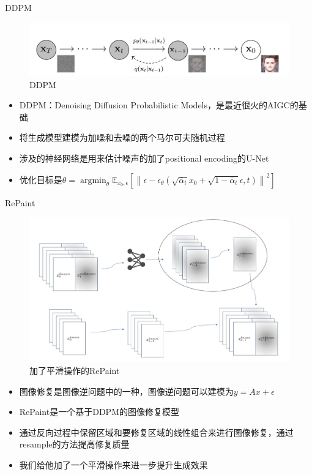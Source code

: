 \documentclass[10pt]{beamer}
\begin{document}
\begin{frame}[fragile]{DDPM}
  \begin{figure}[thbp!]
    \centering
    \includegraphics[width=1\linewidth]{imgs/DDPM.jpg}
    \caption{DDPM}
    \label{fig:DDPM}
    \end{figure}

  \begin{itemize}
    \item DDPM\cite{ho2020denoising}：Denoising Diffusion Probabilistic Models，是最近很火的AIGC的基础
    \item 将生成模型建模为加噪和去噪的两个马尔可夫随机过程
    \item 涉及的神经网络是用来估计噪声的加了positional encoding的U-Net
    \item 优化目标是$\theta = \operatorname{argmin}_{\theta} \mathbb{E}_{x_0,\epsilon}\left[\left\|\epsilon-\epsilon_\theta(\sqrt{\bar{\alpha}_t}x_0+\sqrt{1-\bar{\alpha}_t}\epsilon,t)\right\|^2\right] $
  \end{itemize}
\end{frame}

\begin{frame}[fragile]{RePaint}
  \begin{figure}[thbp!]
    \centering
    \includegraphics[width=0.6\linewidth]{imgs/RePaint.jpg}
    \caption{加了平滑操作的RePaint}
    \label{fig:RePaint}
    \end{figure}
  
  \begin{itemize}
    \item 图像修复是图像逆问题中的一种，图像逆问题可以建模为$y = Ax + \epsilon$
    \item RePaint\cite{lugmayr2022repaint}是一个基于DDPM的图像修复模型
    \item 通过反向过程中保留区域和要修复区域的线性组合来进行图像修复，通过resample的方法提高修复质量
    \item 我们给他加了一个平滑操作来进一步提升生成效果
  \end{itemize}

\end{frame}
\end{document}
